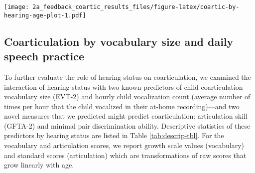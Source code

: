 \documentclass[
]{article}
\begin{document}
\texttt{[image: 2a\_feedback\_coartic\_results\_files/figure-latex/coartic-by-hearing-age-plot-1.pdf]}

\hypertarget{coarticulation-by-vocabulary-size-and-daily-speech-practice}{%
\subsection{Coarticulation by vocabulary size and daily speech practice}\label{coarticulation-by-vocabulary-size-and-daily-speech-practice}}

To further evaluate the role of hearing status on coarticulation, we examined the interaction of hearing status with two known predictors of child coarticulation---vocabulary size (EVT-2) and hourly child vocalization count (average number of times per hour that the child vocalized in their at-home recording)---and two novel measures that we predicted might predict coarticulation: articulation skill (GFTA-2) and minimal pair discrimination ability. Descriptive statistics of these predictors by hearing status are listed in Table \ref{tab:descrip-tbl}. For the vocabulary and articulation scores, we report growth scale values (vocabulary) and standard scores (articulation) which are transformations of raw scores that grow linearly with age.
\end{document}
